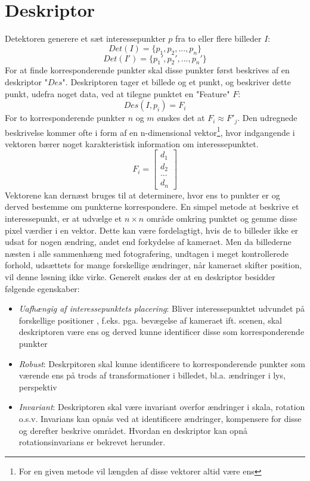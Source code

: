 \section{Deskriptor}
Detektoren generere et sæt interessepunkter $p$ fra to eller flere billeder $I$:
$$ Det(I) = \lbrace p_1,p_2,...,p_n \rbrace $$$$
Det(I') = \lbrace p_1',p_2',...,p_n' \rbrace
$$
For at finde korresponderende punkter skal disse punkter først beskrives af en deskriptor "$Des$". Deskriptoren tager et billede og et punkt, og beskriver dette punkt, udefra noget data, ved at tilegne punktet en "Feature" $F$:
$$ Des(I,p_i)=F_i $$
For to korresponderende punkter $n$ og $m$ ønskes det at $F_i \approx F'_j$. Den udregnede beskrivelse kommer ofte i form af en n-dimensional vektor\footnote{For en given metode vil længden af disse vektorer altid være ens}, hvor indgangende i vektoren bærer noget karakteristisk information om interessepunktet. 
$$ F_i =
\begin{bmatrix}
d_1 \\
d_2 \\
. . . \\
d_n
\end{bmatrix}
$$ Vektorene kan dernæst bruges til at determinere, hvor ens to punkter er og derved bestemme om punkterne korrespondere. En simpel metode at beskrive et interessepunkt, er at udvælge et $n \times n$ område omkring punktet og gemme disse pixel værdier i en vektor. Dette kan være fordelagtigt, hvis de to billeder ikke er udsat for nogen ændring, andet end forkydelse af kameraet. Men da billederne næsten i alle sammenhæng med fotografering, undtagen i meget kontrollerede forhold, udsættets for mange forskellige ændringer, når kameraet skifter position, vil denne løsning ikke virke. Generelt ønskes der at en deskriptor besidder følgende egenskaber:
\begin{itemize}
\item{ \textit{Uafhængig af interessepunktets placering}:
Bliver interessepunktet udvundet på forskellige positioner , f.eks. pga. bevægelse af kameraet ift. scenen, skal deskriptoren være ens og derved kunne identificer disse som korresponderende punkter
 }
\item{\textit{Robust}: Deskrpitoren skal kunne identificere to korresponderende punkter som værende ens på trods af transformationer i billedet, bl.a. ændringer i lys, perspektiv}
\item{\textit{Invariant}: Deskriptoren skal være invariant overfor ændringer i skala, rotation o.s.v. Invarians kan opnås ved at identificere ændringer, kompensere for disse og derefter beskrive området.
Hvordan en deskriptor kan opnå rotationsinvarians er bekrevet herunder.}
\end{itemize}
